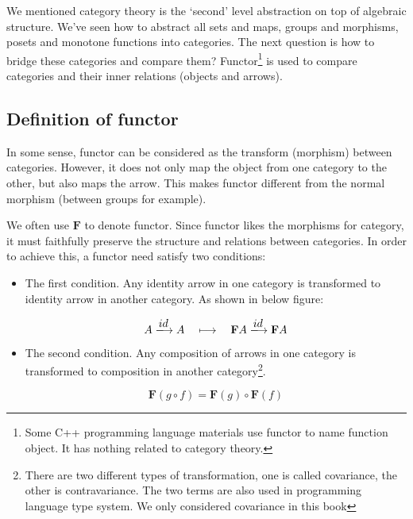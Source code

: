 \documentclass{article}
\begin{document}
We mentioned category theory is the `second' level abstraction on top of algebraic structure. We've seen how to abstract all sets and maps, groups and morphisms, posets and monotone functions into categories. The next question is how to bridge these categories and compare them? Functor\footnote{Some C++ programming language materials use functor to name function object. It has nothing related to category theory.} is used to compare categories and their inner relations (objects and arrows).

\subsection{Definition of functor}
In some sense, functor can be considered as the transform (morphism) between categories. However, it does not only map the object from one category to the other, but also maps the arrow. This makes functor different from the normal morphism (between groups for example).

We often use $\mathbf{F}$ to denote functor. Since functor likes the morphisms for category, it must faithfully preserve the structure and relations between categories. In order to achieve this, a functor need satisfy two conditions:

\begin{itemize}
\item The first condition. Any identity arrow in one category is transformed to identity arrow in another category. As shown in below figure:

\[
A \arrowto{id} A \quad \longmapsto \quad \mathbf{F}A \arrowto{id} \mathbf{F}A
\]

 
\item The second condition. Any composition of arrows in one category is transformed to composition in another category\footnote{There are two different types of transformation, one is called covariance, the other is contravariance. The two terms are also used in programming language type system. We only considered covariance in this book}.

\begin{center}
\end{center}

\[
\mathbf{F}(g \circ f) = \mathbf{F}(g) \circ \mathbf{F}(f)
\]
\end{itemize}
\end{document}
